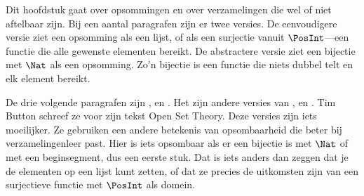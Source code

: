 \documentclass[../../../include/open-logic-chapter]{subfiles}
\begin{document}

\begin{editorial}
Dit hoofdstuk gaat over opsommingen en over verzamelingen die wel of
niet aftelbaar zijn. Bij een aantal paragrafen zijn er twee versies. De
eenvoudigere versie ziet een opsomming als een lijst, of als een
surjectie vanuit $\PosInt$---een functie die alle gewenste elementen
bereikt. De abstractere versie ziet een bijectie met $\Nat$ als een
opsomming. Zo'n bijectie is een functie die niets dubbel telt en elk
element bereikt.
\end{editorial}











\begin{editorial}
De drie volgende paragrafen zijn ,
 en . Het
zijn andere versies van ,
 en . Tim Button
schreef ze voor zijn tekst Open Set Theory. Deze versies zijn iets
moeilijker. Ze gebruiken een andere betekenis van opsombaarheid die
beter bij verzamelingenleer past. Hier is iets opsombaar als er een
bijectie is met $\Nat$ of met een beginsegment, dus een eerste stuk.
Dat is iets anders dan zeggen dat je de elementen op een lijst kunt
zetten, of dat ze precies de uitkomsten zijn van een surjectieve functie
met $\PosInt$ als domein.
\end{editorial}


\OLEndChapterHook
\end{document}
